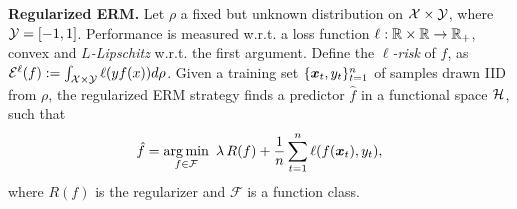 \vspace{0.2cm}\noindent\textbf{Regularized ERM.}
Let $\rho$ a fixed but unknown distribution on $\mathcal{X} \times \mathcal{Y}$, where $\mathcal{Y}=[-1,1]$.
Performance is measured w.r.t. a loss function $\ell: \mathbb{R} \times \mathbb{R} \rightarrow \mathbb{R}_+$, convex and \emph{$L$-Lipschitz} w.r.t. the first argument.
Define the \emph{$\ell$-risk} of $f$, as $\mathcal{E}^{\ell}(f):=\int_{\mathcal{X} \times \mathcal{Y}} \ell(y f(x)) d \rho$.
Given a training set $\{\boldsymbol{x}_t,y_t\}_{t=1}^n$ of samples drawn \ac{IID} from $\rho$, the regularized \ac{ERM} strategy finds a predictor $\hat{f}$ in a functional space $\mathcal{H}$, such that
\[
\hat{f}= \argmin_{f \in \mathcal{F}} \ \lambda\, R(f) + \frac{1}{n} \sum_{t=1}^n \ell(f(\bx_t),y_t),
\]
where $R(f)$ is the regularizer and $\mathcal{F}$ is a function class.
